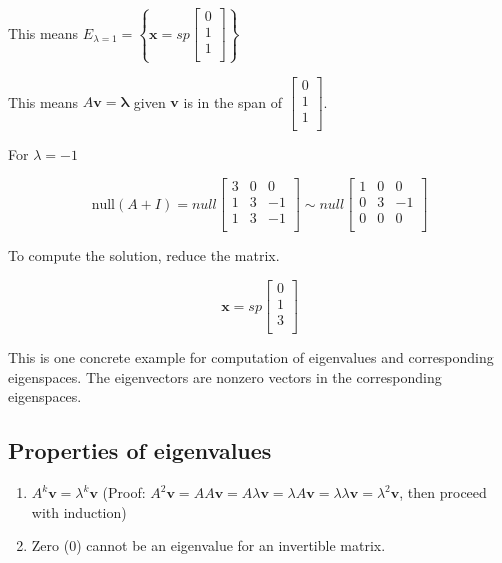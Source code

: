 \documentclass[12pt]{article}
\theoremstyle{plain}
\theoremstyle{remark}
\theoremstyle{definition}
\begin{document}
This means
\(E_{\lambda = 1} = \left\{ \mathbf{x} = sp\begin{bmatrix}
0 \\
1 \\
1 \\
\end{bmatrix} \right\}\)

This means \(A\mathbf{v} = \mathbf{\lambda}\) given
\(\mathbf{v}\) is in the span of \(\begin{bmatrix}
0 \\
1 \\
1 \\
\end{bmatrix}\).

For \(\lambda = - 1\)

\[\text{null}(A + I) = null\begin{bmatrix}
3 & 0 & 0 \\
1 & 3 & - 1 \\
1 & 3 & - 1 \\
\end{bmatrix}\sim null\begin{bmatrix}
1 & 0 & 0 \\
0 & 3 & - 1 \\
0 & 0 & 0 \\
\end{bmatrix}\]

To compute the solution, reduce the matrix.

\[\mathbf{x} = sp\begin{bmatrix}
0 \\
1 \\
3 \\
\end{bmatrix}\]

This is one concrete example for computation of eigenvalues and
corresponding eigenspaces. The eigenvectors are nonzero vectors in the
corresponding eigenspaces.


\subsection{Properties of eigenvalues}

\begin{enumerate}
\def\labelenumi{\arabic{enumi}.}
\item
  \(A^{k}\mathbf{v} = \lambda^{k}\mathbf{v}\) (Proof:
  \(A^{2}\mathbf{v} = AA\mathbf{v} = A\lambda \mathbf{v} = \lambda A\mathbf{v} = \lambda \lambda \mathbf{v} = \lambda^{2}\mathbf{v}\),
  then proceed with induction)
\item
  Zero (0) cannot be an eigenvalue for an invertible matrix.
\end{enumerate}
\end{document}
